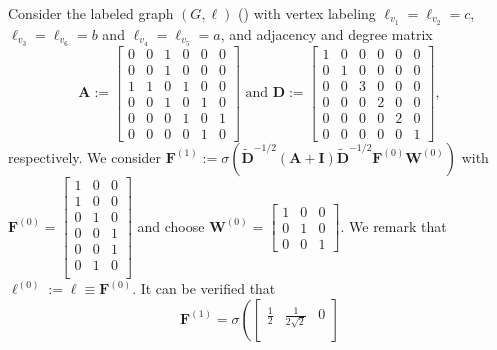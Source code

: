 \begin{example}\label{ex2}\normalfont
Consider the labeled graph $(G,\pmb{\ell})$ () with 
vertex labeling  $\pmb{\ell}_{v_1}=\pmb{\ell}_{v_2}=c$,
$\pmb{\ell}_{v_3}=\pmb{\ell}_{v_6}=b$ and $\pmb{\ell}_{v_4}=\pmb{\ell}_{v_5}=a$, and adjacency and degree matrix 
$$
\mathbf{A}:=\begin{bmatrix}
0 & 0 & 1 & 0 & 0 & 0\\
0 & 0 & 1 & 0 & 0 & 0\\
1 & 1 & 0 & 1 & 0 & 0\\
0 & 0 & 1 & 0 & 1 & 0\\
0 & 0 & 0 & 1 & 0 & 1\\
0 & 0 & 0 & 0 & 1 & 0
\end{bmatrix}\text{ and } 
\mathbf{D}:=
\begin{bmatrix}
1 & 0 & 0 & 0 & 0 & 0\\
0 & 1 & 0 & 0 & 0 & 0\\
0 & 0 & 3 & 0 & 0 & 0\\
0 & 0 & 0 & 2 & 0 & 0\\
0 & 0 & 0 & 0 & 2 & 0\\
0 & 0 & 0 & 0 & 0 & 1
\end{bmatrix},
$$
respectively. 
We consider $\mathbf{F}^{(1)}:=\sigma(\tilde{\mathbf{D}}^{-1/2}(\mathbf{A}+\mathbf{I})\tilde{\mathbf{D}}^{-1/2}\mathbf{F}^{(0)}\mathbf{W}^{(0)})$ with  $
\mathbf{F}^{(0)}=
\left[\begin{smallmatrix}
1 & 0 & 0\\
1 & 0 & 0\\
0 & 1 & 0\\
0 & 0 & 1\\
0 & 0 & 1\\
0 & 1 & 0\\
\end{smallmatrix}\right]
$ and choose $\mathbf{W}^{(0)}=\left[\begin{smallmatrix}
1 & 0 & 0\\
0 & 1 & 0\\
0 & 0 & 1
\end{smallmatrix}\right]$. 
We remark that $\pmb{\ell}^{(0)}:=\pmb{\ell}\equiv \mathbf{F}^{(0)}$.
It can be verified that
$$
\mathbf{F}^{(1)}=\sigma\left(\begin{bmatrix}
\frac{1}{2} & \frac{1}{2\sqrt{2}}& 0\\

\end{bmatrix}$$
\end{example}
